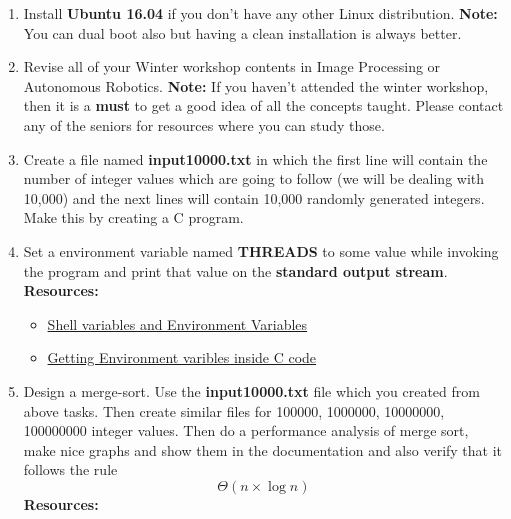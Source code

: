 \documentclass{article}
\begin{document}
\begin{enumerate}%
\item Install {\bf Ubuntu 16.04} if you don't have any other Linux distribution.
{\newline}{\newline}
{\bf Note:} You can dual boot also but having a clean installation is always better.

\item Revise all of your Winter workshop contents in Image Processing or Autonomous Robotics.
{\newline}{\newline}
{\bf Note:} If you haven't attended the winter workshop, then it is a {\bf must} to get a good idea of all the concepts taught. Please contact any of the seniors for resources where you can study those.

\item Create a file named {\bf input10000.txt} in which the first line will contain the number of integer values which are going to follow (we will be dealing with 10,000) and the next lines will contain 10,000 randomly generated integers. Make this by creating a C program.

\item Set a environment variable named {\bf THREADS} to some value while invoking the program and print that value on the {\bf standard output stream}.
{\newline}{\newline}
{\bf Resources:}

    \begin{itemize}
        \item \href{http://sc.tamu.edu/help/general/unix/vars.html}{Shell variables and Environment Variables}
        \item \href{http://www0.cs.ucl.ac.uk/staff/ucacbbl/getenv/}{Getting Environment varibles inside C code}
    \end{itemize}

\item Design a merge-sort. Use the {\bf input10000.txt} file which you created from above tasks. Then create similar files for 100000, 1000000, 10000000, 100000000 integer values. Then do a performance analysis of merge sort, make nice graphs and show them in the documentation and also verify that it follows the rule \[ \Theta (n \times \log n) \]
{\newline}{\newline}
{\bf Resources:}


\end{enumerate}
\end{document}
